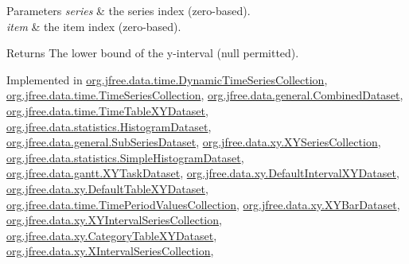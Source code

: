 \begin{DoxyParams}{Parameters}
{\em series} & the series index (zero-\/based). \\
\hline
{\em item} & the item index (zero-\/based).\\
\hline
\end{DoxyParams}
\begin{DoxyReturn}{Returns}
The lower bound of the y-\/interval ({\ttfamily null} permitted). 
\end{DoxyReturn}


Implemented in \mbox{\hyperlink{classorg_1_1jfree_1_1data_1_1time_1_1_dynamic_time_series_collection_a9fb776918a455a76c7d03b80cc75703b}{org.\+jfree.\+data.\+time.\+Dynamic\+Time\+Series\+Collection}}, \mbox{\hyperlink{classorg_1_1jfree_1_1data_1_1time_1_1_time_series_collection_a39159edbe3d2f1ee4e990eba2294ca1e}{org.\+jfree.\+data.\+time.\+Time\+Series\+Collection}}, \mbox{\hyperlink{classorg_1_1jfree_1_1data_1_1general_1_1_combined_dataset_a61823c1340aecd2cdb79536f78ca1d89}{org.\+jfree.\+data.\+general.\+Combined\+Dataset}}, \mbox{\hyperlink{classorg_1_1jfree_1_1data_1_1time_1_1_time_table_x_y_dataset_a7ca009f40f1b341c4a1bf7da9ef461de}{org.\+jfree.\+data.\+time.\+Time\+Table\+X\+Y\+Dataset}}, \mbox{\hyperlink{classorg_1_1jfree_1_1data_1_1statistics_1_1_histogram_dataset_aa8bbdecb3157607d7522130d08cca440}{org.\+jfree.\+data.\+statistics.\+Histogram\+Dataset}}, \mbox{\hyperlink{classorg_1_1jfree_1_1data_1_1general_1_1_sub_series_dataset_a052aebbd647cedf1958cbac4b198eb7a}{org.\+jfree.\+data.\+general.\+Sub\+Series\+Dataset}}, \mbox{\hyperlink{classorg_1_1jfree_1_1data_1_1xy_1_1_x_y_series_collection_acfaf042a69d421089ae292ec591e7799}{org.\+jfree.\+data.\+xy.\+X\+Y\+Series\+Collection}}, \mbox{\hyperlink{classorg_1_1jfree_1_1data_1_1statistics_1_1_simple_histogram_dataset_a3cea8376e1afeb2064fc3a36b72d8c4b}{org.\+jfree.\+data.\+statistics.\+Simple\+Histogram\+Dataset}}, \mbox{\hyperlink{classorg_1_1jfree_1_1data_1_1gantt_1_1_x_y_task_dataset_ac57b2efa4ecc02718674beae6f1526c0}{org.\+jfree.\+data.\+gantt.\+X\+Y\+Task\+Dataset}}, \mbox{\hyperlink{classorg_1_1jfree_1_1data_1_1xy_1_1_default_interval_x_y_dataset_ad9406f2afbf209d346903c0a004f4aad}{org.\+jfree.\+data.\+xy.\+Default\+Interval\+X\+Y\+Dataset}}, \mbox{\hyperlink{classorg_1_1jfree_1_1data_1_1xy_1_1_default_table_x_y_dataset_ad447b9f576948e9b3e7d4ba78c848558}{org.\+jfree.\+data.\+xy.\+Default\+Table\+X\+Y\+Dataset}}, \mbox{\hyperlink{classorg_1_1jfree_1_1data_1_1time_1_1_time_period_values_collection_ad2e6b7fc456ccf6b7492c720f722198e}{org.\+jfree.\+data.\+time.\+Time\+Period\+Values\+Collection}}, \mbox{\hyperlink{classorg_1_1jfree_1_1data_1_1xy_1_1_x_y_bar_dataset_a73d9f2c262f9bc9025b4325873394a09}{org.\+jfree.\+data.\+xy.\+X\+Y\+Bar\+Dataset}}, \mbox{\hyperlink{classorg_1_1jfree_1_1data_1_1xy_1_1_x_y_interval_series_collection_a7ab36e2809364dab0db10b575f58ae14}{org.\+jfree.\+data.\+xy.\+X\+Y\+Interval\+Series\+Collection}}, \mbox{\hyperlink{classorg_1_1jfree_1_1data_1_1xy_1_1_category_table_x_y_dataset_a238f0976910c53c4ad62cf58ec3e758c}{org.\+jfree.\+data.\+xy.\+Category\+Table\+X\+Y\+Dataset}}, \mbox{\hyperlink{classorg_1_1jfree_1_1data_1_1xy_1_1_x_interval_series_collection_a2856a59b5f688fcf7c824c1c0c1daa41}{org.\+jfree.\+data.\+xy.\+X\+Interval\+Series\+Collection}}, 